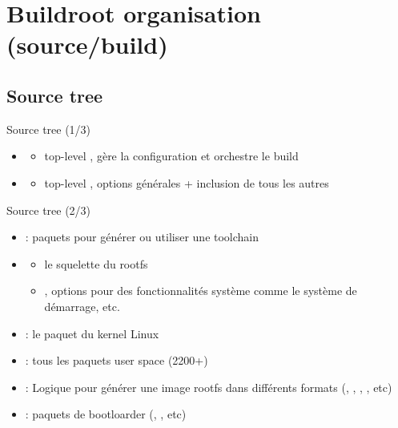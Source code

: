\documentclass[aspectratio=169,obeyspaces,spaces,hyphens,dvipsnames]{beamer}
\begin{document}
\section{Buildroot organisation (source/build)}

\subsection{Source tree}

\begin{frame}{Source tree (1/3)}
  \begin{itemize}
  \item {}
    \begin{itemize}
    \item top-level , gère la configuration et orchestre le build
    \end{itemize}
  \item {}
    \begin{itemize}
    \item top-level , options générales + inclusion de tous les
      autres 
    \end{itemize}
  \end{itemize}
\end{frame}

\begin{frame}{Source tree (2/3)}
  \begin{itemize}
  \item {} : paquets pour générer ou utiliser une toolchain
  \item {}
    \begin{itemize}
    \item {} le squelette du rootfs
    \item {}, options pour des fonctionnalités système comme
      le système de démarrage, etc.
    \end{itemize}
  \item {} : le paquet du kernel Linux
  \item {} : tous les paquets user space (2200+)
  \item {} : Logique pour générer une image rootfs dans différents
    formats (, , , , etc)
  \item {} : paquets de bootloarder (, , etc)
  \end{itemize}
\end{frame}
\end{document}

